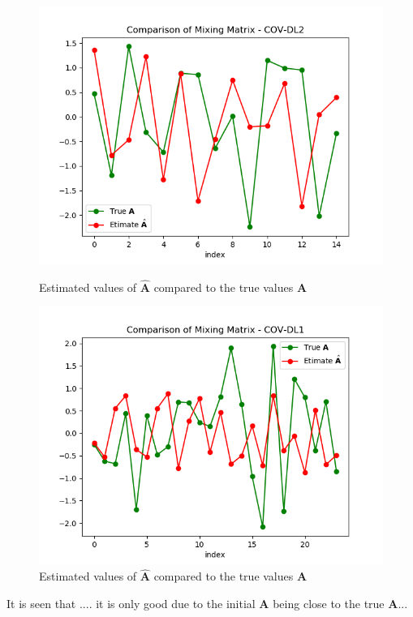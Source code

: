 \begin{figure}[H]
    \begin{minipage}[t]{.45\textwidth}
    	\centering
		\includegraphics[scale=0.5]{figures/ch_6/COV2_simple.png}
		\caption{Estimated values of $\hat{\textbf{A}}$ compared to the true 					values $\textbf{A}$}
		\label{fig:cov2_simple}
    \end{minipage} 
    \hfill
    \begin{minipage}[t]{.45\textwidth}
        \centering
		\includegraphics[scale=0.5]{figures/ch_6/COV1_simple.png}
		\caption{Estimated values of $\hat{\textbf{A}}$ compared to the true 				values $\textbf{A}$}
		\label{fig:cov1_simple}
    \end{minipage}
\end{figure}
It is seen that .... it is only good due to the initial $\textbf{A}$ being close to the true $\textbf{A}$...


